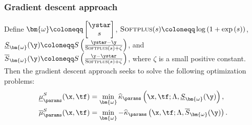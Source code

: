 \subsubsection{Gradient descent approach}
Define $\bm{\omega} \coloneqq \begin{bmatrix} \ystar \\ s \end{bmatrix}$, $\textsc{Softplus}(s) \coloneqq \log{(1 + \exp{(s)})}$, $\underline{S}_{\bm{\omega}}(\y) \coloneqq S\left(\frac{\ystar-\y}{\textsc{Softplus}(s) + \zeta}\right)$, and $\overline{S}_{\bm{\omega}}(\y) \coloneqq S\left(\frac{\y-\ystar}{\textsc{Softplus}(s) + \zeta}\right)$, where $\zeta$ is a small positive constant.
Then the gradient descent approach seeks to solve the following optimization problems:
\begin{equation*}
    \begin{split}
        \underline{\mu}_{\params}^{S}(\x, \tf) &= \min_{\bm{\omega}} \widehat{\kappa}_{\params}\left(\x, \tf; \Lambda, \underline{S}_{\bm{\omega}}(\y) \right), \\
        \overline{\mu}_{\params}^{S}(\x, \tf) &= \min_{\bm{\omega}} -\widehat{\kappa}_{\params}\left(\x, \tf; \Lambda, \overline{S}_{\bm{\omega}}(\y) \right).
    \end{split}
\end{equation*}

